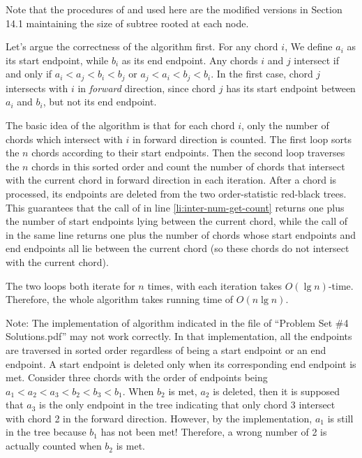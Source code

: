 \documentclass[a4paper, fleqn]{article}
\begin{document}
Note that the procedures of  and  used
here are the modified versions in Section 14.1 maintaining the size of
subtree rooted at each node.

Let's argue the correctness of the algorithm first. For any chord $i$,
We define $a_i$ as its start endpoint, while $b_i$ as its end
endpoint. Any chords $i$ and $j$ intersect if and only if $a_i < a_j <
b_i < b_j$ or $a_j < a_i < b_j < b_i$. In the first case, chord $j$
intersects with $i$ in \emph{forward} direction, since chord $j$ has
its start endpoint between $a_i$ and $b_i$, but not its end endpoint.

The basic idea of the algorithm is that for each chord $i$, only the
number of chords which intersect with $i$ in forward direction is
counted. The first  loop sorts the $n$ chords according to
their start endpoints. Then the second  loop traverses the $n$
chords in this sorted order and count the number of chords that
intersect with the current chord in forward direction in each
iteration. After a chord is processed, its endpoints are deleted from
the two order-statistic red-black trees. This guarantees that the call
of  in line \ref{li:inter-num-get-count} returns
one plus the number of start endpoints lying between the current
chord, while the call of  in the same line returns one
plus the number of chords whose start endpoints and end endpoints all
lie between the current chord (so these chords do not intersect with
the current chord).

The two  loops both iterate for $n$ times, with each iteration
takes $O(\lg n)$-time. Therefore, the whole algorithm takes running
time of $O(n \lg n)$.

Note: The implementation of algorithm indicated in the file of
``Problem Set \#4 Solutions.pdf'' may not work correctly. In that
implementation, all the endpoints are traversed in sorted order
regardless of being a start endpoint or an end endpoint. A start
endpoint is deleted only when its corresponding end endpoint is
met. Consider three chords with the order of endpoints being $a_1 <
a_2 < a_3 < b_2 < b_3 < b_1$. When $b_2$ is met, $a_2$ is deleted,
then it is supposed that $a_3$ is the only endpoint in the tree
indicating that only chord 3 intersect with chord 2 in the forward
direction. However, by the implementation, $a_1$ is still in the tree
because $b_1$ has not been met! Therefore, a wrong number of 2 is
actually counted when $b_2$ is met.
\end{document}
